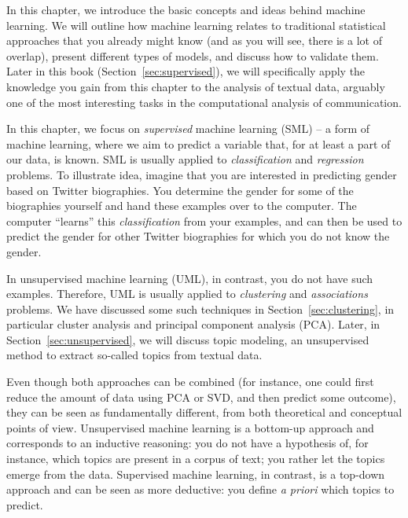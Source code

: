 In this chapter, we introduce the basic concepts and ideas behind
machine learning.  We will outline how machine learning relates to
traditional statistical approaches that you already might know (and as
you will see, there is a lot of overlap), present different types of
models, and discuss how to validate them.
Later in this book (Section~\ref{sec:supervised}), we will
specifically apply the knowledge you gain from this chapter to the
analysis of textual data, arguably one of the most interesting tasks
in the computational analysis of communication.

In this chapter, we focus on \emph{supervised} machine learning (SML)
-- a form of machine learning, where we aim to predict a variable
that, for at least a part of our data, is known. SML is usually applied to \textit{classification} and \textit{regression}  problems. To illustrate 
idea, imagine that you are interested in predicting  gender based
on Twitter biographies. You determine the gender for some of the
biographies yourself and hand these examples over to the computer. The
computer ``learns'' this \textit{classification} from your examples, and can then be used to predict the gender for other Twitter biographies for which you do not
know the gender.

In unsupervised machine learning (UML), in contrast, you do not have such
examples. Therefore, UML is usually applied to \textit{clustering} and \textit{associations} problems. We have discussed some  such techniques in Section~\ref{sec:clustering}, in particular cluster analysis and
principal component analysis (PCA).
Later, in Section~\ref{sec:unsupervised}, we will discuss topic modeling, an unsupervised method to extract so-called topics from textual data.


Even though both approaches can be combined (for instance, one could
first reduce the amount of data using PCA or SVD, and then predict some
outcome), they can be seen as fundamentally different,  from both
theoretical and conceptual points of view.  Unsupervised machine
learning is a bottom-up approach and corresponds to an inductive
reasoning: you do not have a hypothesis of, for instance, which topics
are present in a corpus of text; you rather let the topics emerge from
the data.  Supervised machine learning, in contrast, is a top-down
approach and can be seen as more deductive: you define \emph{a priori} which
topics to predict.


%
